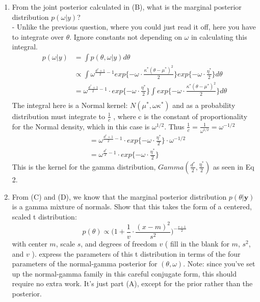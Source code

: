 \documentclass{homework}
\begin{document}
\begin{enumerate}[label=(\Alph*)]
\item  From the joint posterior calculated in (B), what is the marginal posterior distribution $p(\omega | y)$? \\ 
- Unlike the previous question, where you could just read it off, here you have to integrate over $\theta$. Ignore constants not depending on $\omega$ in calculating this integral.
\begin{equation} \begin{split}
p(\omega | y) & = \int p(\theta,\omega | y) d\theta \\
& \propto \int \omega^{\frac{d^*+1}{2} - 1}exp\{ -\omega \cdot \frac{\kappa^*(\theta - \mu^*)^2}{2}\}exp\{-\omega \cdot \frac{\eta^*}{2}\} d\theta \\
& =   \omega^{\frac{d^*+1}{2} - 1} \cdot exp\{-\omega \cdot \frac{\eta^*}{2}\} \int exp\{ -\omega \cdot \frac{\kappa^*(\theta - \mu^*)^2}{2}\} d\theta \\
\end{split} \end{equation}
The integral here is a Normal kernel: $N (\mu^*, \omega\kappa^*)$ and as a probability distribution must integrate to $\frac{1}{c}$ , where c is the constant of proportionality for the Normal density, which in this case is $\omega^{1/2}$.  Thus $\frac{1}{c} = \frac{1}{\omega^{1/2}} = \omega^{-1/2}$ 
\begin{equation} \begin{split}
& = \omega^{\frac{d^*+1}{2} - 1} \cdot exp\{-\omega \cdot \frac{\eta^*}{2}\}  \cdot \omega^{-1/2} \\
& = \omega^{\frac{d^*}{2} - 1} \cdot exp\{-\omega \cdot \frac{\eta^*}{2}\}  
\end{split} \end{equation}
This is the kernel for the gamma distribution, $Gamma(\frac{d^*}{2} , \frac{\eta^*}{2})$ as seen in Eq 2.



\item From (C) and (D), we know that the marginal posterior distribution $p(\theta | \textbf{y})$ is a gamma mixture of normals. Show that this takes the form of a centered, scaled t distribution:
$$p(\theta) \propto \big( 1 + \frac{1}{v} \cdot \frac{(x-m)^2}{s^2}\big)^{-\frac{v+1}{2}}$$
with center $m$, scale $s$, and degrees of freedom $v$ ( fill in the blank for $m$, $s^2$, and $v$ ). 
express the parameters of this t distribution in terms of the four parameters of the normal-gamma posterior for $(\theta, \omega)$. Note: since you've set up the normal-gamma family in this careful conjugate form, this should require no extra work. It's just part (A), except for the prior rather than the posterior.


\end{enumerate}
\end{document}
